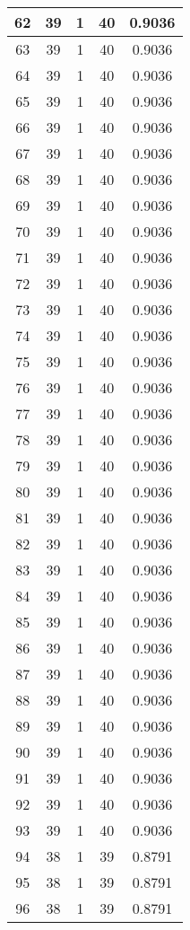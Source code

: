\documentclass[letterpaper, 12pt]{article}
\begin{document}
\begin{longtable}{|c|c|c|c|c|}
\hline
62 & 39 & 1 & 40 & 0.9036 \\
\hline
63 & 39 & 1 & 40 & 0.9036 \\
\hline
64 & 39 & 1 & 40 & 0.9036 \\
\hline
65 & 39 & 1 & 40 & 0.9036 \\
\hline
66 & 39 & 1 & 40 & 0.9036 \\
\hline
67 & 39 & 1 & 40 & 0.9036 \\
\hline
68 & 39 & 1 & 40 & 0.9036 \\
\hline
69 & 39 & 1 & 40 & 0.9036 \\
\hline
70 & 39 & 1 & 40 & 0.9036 \\
\hline
71 & 39 & 1 & 40 & 0.9036 \\
\hline
72 & 39 & 1 & 40 & 0.9036 \\
\hline
73 & 39 & 1 & 40 & 0.9036 \\
\hline
74 & 39 & 1 & 40 & 0.9036 \\
\hline
75 & 39 & 1 & 40 & 0.9036 \\
\hline
76 & 39 & 1 & 40 & 0.9036 \\
\hline
77 & 39 & 1 & 40 & 0.9036 \\
\hline
78 & 39 & 1 & 40 & 0.9036 \\
\hline
79 & 39 & 1 & 40 & 0.9036 \\
\hline
80 & 39 & 1 & 40 & 0.9036 \\
\hline
81 & 39 & 1 & 40 & 0.9036 \\
\hline
82 & 39 & 1 & 40 & 0.9036 \\
\hline
83 & 39 & 1 & 40 & 0.9036 \\
\hline
84 & 39 & 1 & 40 & 0.9036 \\
\hline
85 & 39 & 1 & 40 & 0.9036 \\
\hline
86 & 39 & 1 & 40 & 0.9036 \\
\hline
87 & 39 & 1 & 40 & 0.9036 \\
\hline
88 & 39 & 1 & 40 & 0.9036 \\
\hline
89 & 39 & 1 & 40 & 0.9036 \\
\hline
90 & 39 & 1 & 40 & 0.9036 \\
\hline
91 & 39 & 1 & 40 & 0.9036 \\
\hline
92 & 39 & 1 & 40 & 0.9036 \\
\hline
93 & 39 & 1 & 40 & 0.9036 \\
\hline
94 & 38 & 1 & 39 & 0.8791 \\
\hline
95 & 38 & 1 & 39 & 0.8791 \\
\hline
96 & 38 & 1 & 39 & 0.8791 \\

\end{longtable}
\end{document}

